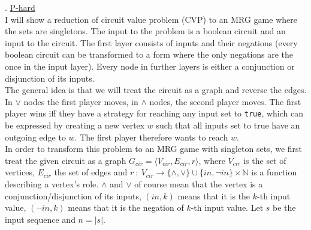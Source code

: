 . \underline{P-hard}\\
I will show a reduction of circuit value problem (CVP) to an MRG game where the sets are singletons.
The input to the problem is a boolean circuit and an input to the circuit. The first layer consists of inputs
and their negations (every boolean circuit can be transformed to a form where the only negations are the once
in the input layer). Every node in further layers is either a conjunction or disjunction of its inputs.\\

\noindent
The general idea is that we will treat the circuit as a graph and reverse the edges. In $\lor$ nodes the first
player moves, in $\land$ nodes, the second player moves. The first player wins iff they have a strategy for
reaching any input set to \texttt{true}, which can be expressed by creating a new vertex $w$ such that all inputs
set to true have an outgoing edge to $w$. The first player therefore wants to reach $w$.\\

\noindent
In order to transform this problem to an MRG game with singleton sets, we first treat the given circuit as a
graph $G_{cir} = \langle V_{cir}, E_{cir}, r \rangle$, where $V_{cir}$ is the set of vertices, $E_{cir}$ the
set of edges and $r\ :\ V_{cir} \rightarrow \{ \land, \lor \} \cup \{in, \lnot in\} \times \mathbb{N}$
is a function describing a vertex's role. $\land$ and $\lor$ of course mean that the vertex is a conjunction/disjunction
of its inputs, $(in, k)$ means that it is the $k$-th input value, $(\lnot in, k)$ means that it is the negation
of $k$-th input value. Let $s$ be the input sequence and $n = |s|$.\\

